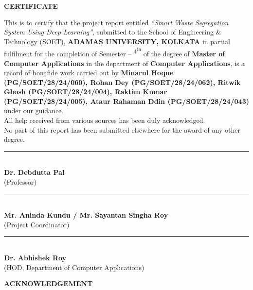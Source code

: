 \documentclass[BTech]{audiss}
\begin{document}
\begin{center}
{\Large \textbf{CERTIFICATE}}\\[1.5em]
\end{center}

\vspace{1em}
\noindent
This is to certify that the project report entitled \textit{``Smart Waste Segregation System Using Deep Learning''}, submitted to the School of Engineering \& Technology (SOET), \textbf{ADAMAS UNIVERSITY, KOLKATA} in partial fulfilment for the completion of Semester -- \textsuperscript{4\textsuperscript{th}} of the degree of \textbf{Master of Computer Applications} in the department of \textbf{Computer Applications}, is a record of bonafide work carried out by \textbf{Minarul Hoque (PG/SOET/28/24/060), Rohan Dey (PG/SOET/28/24/062), Ritwik Ghosh (PG/SOET/28/24/004), Raktim Kumar (PG/SOET/28/24/005), Ataur Rahaman Ddin (PG/SOET/28/24/043)} under our guidance.\\[1em]

All help received from various sources has been duly acknowledged.\\
No part of this report has been submitted elsewhere for the award of any other degree.\\[4em]

\begin{center}
\rule{8cm}{0.4pt}\\
{\textbf{Dr. Debdutta Pal}}\\
{(Professor)}\\[3em]

\rule{8cm}{0.4pt}\\
{\textbf{Mr. Aninda Kundu / Mr. Sayantan Singha Roy}}\\
{(Project Coordinator)}\\[3em]

\rule{8cm}{0.4pt}\\
{\textbf{Dr. Abhishek Roy}}\\
{(HOD, Department of Computer Applications)}\\[2em]
\end{center}

\pagebreak

\begin{center}
{\Large \textbf{ACKNOWLEDGEMENT}}\\[2em]
\end{center}
\end{document}
